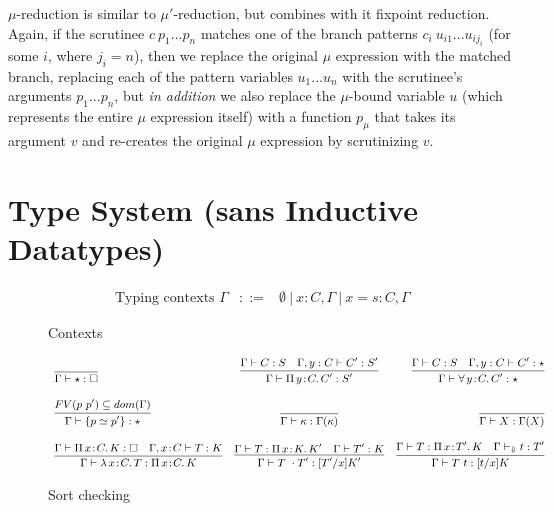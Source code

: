 \documentclass{article}
\newcommand{\ann}[2]{#1\! : \! #2}
\newcommand{\abs}[4]{{#1}\, #2\! : \! #3.\, #4}
\newcommand{\decchk}{\vdash_{\Downarrow}}
\begin{document}
$\mu$-reduction is similar to $\mu'$-reduction, but combines with it fixpoint
reduction. Again, if the scrutinee $c\ p_1 ... p_n$ matches one of the branch
patterns $c_i\ u_{i1} ... u_{ij_i}$ (for some $i$, where $j_i = n$), then we
replace the original $\mu$ expression with the matched branch, replacing each of
the pattern variables $u_1 ... u_n$ with the scrutinee's arguments $p_1 ...
p_n$, but \textit{in addition} we also replace the $\mu$-bound variable $u$
(which represents the entire $\mu$ expression itself) with a function $p_\mu$
that takes its argument $v$ and re-creates the original $\mu$ expression by
scrutinizing $v$.

\section{Type System (sans Inductive Datatypes)}
\label{sec:type-system}

\begin{figure}[h]
  \caption{Contexts}
  \[
    \begin{array}{llll}
      \text{ Typing contexts } \Gamma
      & ::= & \emptyset\ |\ \ann{x}{C},\Gamma\ |\ \ann{x=s}{C},\Gamma
    \end{array}
  \]
\end{figure}
\begin{figure}[h!]
  \[ \small
    \begin{array}{lcr}
      \infer{\Gamma\vdash \star : \Box}{\ }
      & \infer
        { \Gamma\vdash\abs{\Pi}{y}{C}{C'} : S'}
        { \Gamma \vdash C : S
        \quad
        \Gamma,y:C\vdash C' : S'
        }
      & \infer
        {\Gamma\vdash\abs{\forall}{y}{C}{C'} : \star}
        {\Gamma \vdash C : S
        \quad \Gamma,y:C\vdash C' : \star
        }
      \\
      \\ \infer
      { \Gamma \vdash \{p \simeq p' \} : \star}
      { FV(p\ p') \subseteq dom(\Gamma) }
      & \infer
        { \Gamma \vdash \kappa : \Gamma(\kappa)}
        { }
      & \infer
        { \Gamma \vdash X : \Gamma(X)}
        { }
      \\
      \\ \infer
      { \Gamma \vdash \abs{\lambda}{x}{C}{T} : \abs{\Pi}{x}{C}{K}}
      { \Gamma \vdash \abs{\Pi}{x}{C}{K} : \square
      \quad \Gamma, \ann{x}{C} \vdash T : K
      }
      & \infer
        { \Gamma \vdash T\ \cdot T' : [T'/x] K'}
        { \Gamma \vdash T : \abs{\Pi}{x}{K}{K'}
        \quad \Gamma \vdash T' : K}
      & \infer
       { \Gamma \vdash T\ t : [t/x] K}
        { \Gamma \vdash T : \abs{\Pi}{x}{T'}{K}
        \quad \Gamma \decchk t : T' }
    \end{array}
  \]
  \caption{Sort checking }
  \label{fig:sort-checking}
\end{figure}
\end{document}
